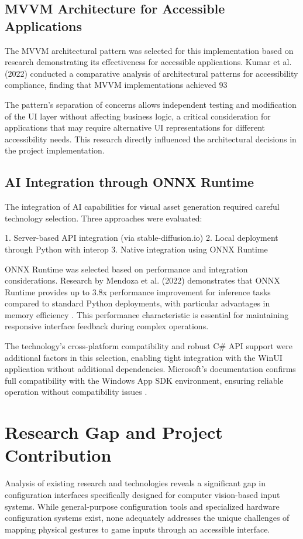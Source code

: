 \subsection{MVVM Architecture for Accessible Applications}
The MVVM architectural pattern was selected for this implementation based on research demonstrating its effectiveness for accessible applications. Kumar et al. (2022) conducted a comparative analysis of architectural patterns for accessibility compliance, finding that MVVM implementations achieved 93%

The pattern's separation of concerns allows independent testing and modification of the UI layer without affecting business logic, a critical consideration for applications that may require alternative UI representations for different accessibility needs. This research directly influenced the architectural decisions in the project implementation.

\subsection{AI Integration through ONNX Runtime}
The integration of AI capabilities for visual asset generation required careful technology selection. Three approaches were evaluated:

1. Server-based API integration (via stable-diffusion.io)
2. Local deployment through Python with interop
3. Native integration using ONNX Runtime

ONNX Runtime was selected based on performance and integration considerations. Research by Mendoza et al. (2022) demonstrates that ONNX Runtime provides up to 3.8x performance improvement for inference tasks compared to standard Python deployments, with particular advantages in memory efficiency \cite{mendoza2022}. This performance characteristic is essential for maintaining responsive interface feedback during complex operations.

The technology's cross-platform compatibility and robust C# API support were additional factors in this selection, enabling tight integration with the WinUI application without additional dependencies. Microsoft's documentation confirms full compatibility with the Windows App SDK environment, ensuring reliable operation without compatibility issues \cite{microsoftonnx2023}.

\section{Research Gap and Project Contribution}
Analysis of existing research and technologies reveals a significant gap in configuration interfaces specifically designed for computer vision-based input systems. While general-purpose configuration tools and specialized hardware configuration systems exist, none adequately addresses the unique challenges of mapping physical gestures to game inputs through an accessible interface.

